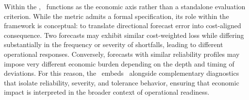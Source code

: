 Within the \FRF, \CWSL\ functions as the economic axis rather than a standalone evaluation
criterion. While the metric admits a formal specification, its role within the framework is
conceptual: to translate directional forecast error into cost-aligned consequence. Two forecasts
may exhibit similar cost-weighted loss while differing substantially in the frequency or severity
of shortfalls, leading to different operational responses. Conversely, forecasts with similar
reliability profiles may impose very different economic burden depending on the depth and
timing of deviations. For this reason, the \FRF\ embeds \CWSL\ alongside complementary
diagnostics that isolate reliability, severity, and tolerance behavior, ensuring that economic
impact is interpreted in the broader context of operational readiness.
